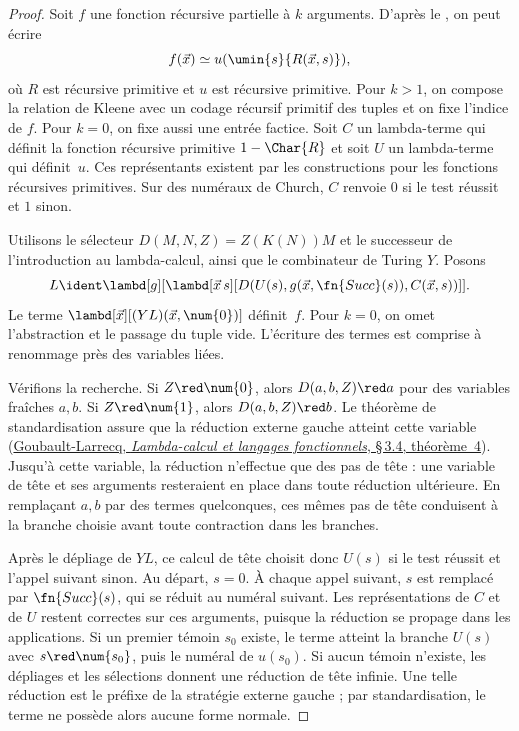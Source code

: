 \documentclass[../../../include/open-logic-section]{subfiles}
\begin{document}
\begin{proof}
Soit $f$ une fonction récursive partielle à $k$ arguments.
D'après le , on peut écrire
\[
  f(\vec x)\simeq u(\umin{s}{R(\vec x,s)}),
\]
où $R$ est récursive primitive et $u$ est récursive primitive.
Pour $k>1$, on compose la relation de Kleene avec un codage
récursif primitif des tuples et on fixe l'indice de $f$.
Pour $k=0$, on fixe aussi une entrée factice. Soit $C$ un
lambda-terme qui définit la fonction récursive primitive
$1-\Char{R}$ et soit $U$ un lambda-terme qui définit~$u$.
Ces représentants existent par les constructions pour les
fonctions récursives primitives. Sur des numéraux de Church,
$C$ renvoie $\num{0}$ si le test réussit et $\num{1}$ sinon.

Utilisons le sélecteur $D(M,N,Z)=Z(K(N))M$ et le successeur
de l'introduction au lambda-calcul, ainsi que le combinateur
de Turing $Y$. Posons
\[
  L\ident\lambd[g][\lambd[\vec x\,s][
    D(U(s),g(\vec x,\fn{Succ}(s)),C(\vec x,s))]] .
\]
Le terme $\lambd[\vec x][(Y L)(\vec x,\num{0})]$
définit~$f$. Pour $k=0$, on omet l'abstraction et le passage
du tuple vide. L'écriture des termes est comprise à renommage
près des variables liées.

Vérifions la recherche. Si $Z\red\num{0}$, alors
$D(a,b,Z)\red a$ pour des variables fraîches $a,b$.
Si $Z\red\num{1}$, alors $D(a,b,Z)\red b$.
Le théorème de standardisation assure que la réduction externe
gauche atteint cette variable
(\href{https://lsv.ens-paris-saclay.fr/~goubault/Lambda/lambda.pdf\#page=20}%
{Goubault-Larrecq, \emph{Lambda-calcul et langages fonctionnels},
\S\,3.4, théorème~4}). Jusqu'à cette variable, la réduction
n'effectue que des pas de tête : une variable de tête et ses
arguments resteraient en place dans toute réduction ultérieure.
En remplaçant $a,b$ par des termes quelconques, ces mêmes pas
de tête conduisent à la branche choisie avant toute contraction
dans les branches.

Après le dépliage de $Y L$, ce calcul de tête choisit donc
$U(s)$ si le test réussit et l'appel suivant sinon. Au départ,
$s=\num{0}$. À chaque appel suivant, $s$ est remplacé par
$\fn{Succ}(s)$, qui se réduit au numéral suivant. Les
représentations de $C$ et de $U$ restent correctes sur ces
arguments, puisque la réduction se propage dans les applications.
Si un premier témoin $s_0$ existe, le terme atteint la branche
$U(s)$ avec $s\red\num{s_0}$, puis le numéral de $u(s_0)$.
Si aucun témoin n'existe, les dépliages et les sélections donnent
une réduction de tête infinie. Une telle réduction est le
préfixe de la stratégie externe gauche ; par standardisation,
le terme ne possède alors aucune forme normale.
\end{proof}
\end{document}
